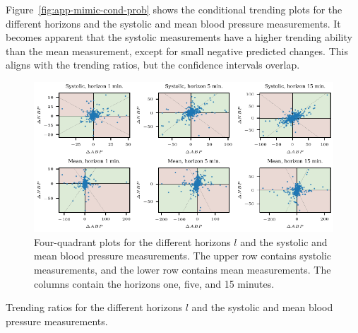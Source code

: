 \documentclass[pdflatex]{sn-jnl}
\theoremstyle{plain}%
\theoremstyle{definition}
\begin{document}
Figure~\ref{fig:app-mimic-cond-prob} shows the conditional trending plots for the different horizons and the systolic and mean blood pressure measurements.
It becomes apparent that the systolic measurements have a higher trending ability than the mean measurement, except for small negative predicted changes.
This aligns with the trending ratios, but the confidence intervals overlap.

\begin{figure}
    \centering
    \includegraphics{plots/mimic/plot_4q}
    \caption[Four-quadrant plots for the different horizons and the systolic and mean blood pressure measurements. ]{Four-quadrant plots for the different horizons $l$ and the systolic and mean blood pressure measurements. The upper row contains systolic measurements, and the lower row contains mean measurements. The columns contain the horizons one, five, and 15 minutes.}
    \label{fig:app-mimic-4q}
\end{figure}

\begin{table}
    \centering
    
    \caption[Trending ratios for the different horizons $l$ and the systolic and mean blood pressure measurements.]{Trending ratios for the different horizons $l$ and the systolic and mean blood pressure measurements.}
    \label{tab:app-mimic-trending-ratios}
\end{table}
\end{document}
